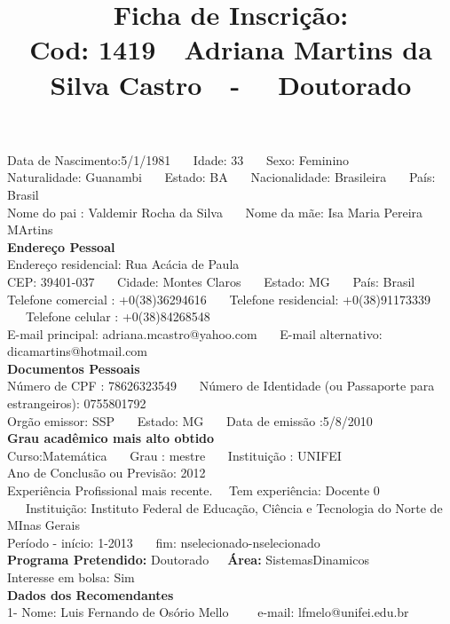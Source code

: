 \documentclass[11pt]{article}
\title{\vspace*{-4cm} Ficha de Inscrição: \\Cod: 1419\ \ Adriana Martins da Silva Castro\ \ - \ \ Doutorado 
 }
\date{}
\begin{document}
\maketitle
\vspace*{-1.5cm}
\noindent Data de Nascimento:5/1/1981
\ \ \ Idade: 33   \ \ \ Sexo: Feminino
\\
Naturalidade: Guanambi  
\ \ \  Estado: BA
\ \ \  Nacionalidade: Brasileira
\ \ \ País: Brasil
\\        
Nome do pai : Valdemir Rocha da Silva
\ \ \ Nome da mãe: Isa Maria Pereira MArtins          
\\[0.2cm]                     
\textbf{Endereço Pessoal} 
\\ 
\noindent Endereço residencial: Rua Acácia de Paula
\\
        CEP: 39401-037 
\ \ \ Cidade: Montes Claros 
\ \ \ Estado: MG 
\ \ \ País: Brasil
\\		
		Telefone comercial : +0(38)36294616
\ \ \ Telefone residencial: +0(38)91173339
\ \ \ Telefone celular : +0(38)84268548
\\
E-mail principal: adriana.mcastro@yahoo.com
\ \ \ E-mail alternativo: dicamartins@hotmail.com 
\\[0.2cm] 
\textbf{Documentos Pessoais}
\\
\noindent Número de CPF : 78626323549
\ \ \ Número de Identidade (ou Passaporte para estrangeiros): 0755801792
\\
Orgão emissor: SSP
\ \ \ Estado: MG
\ \ \ Data de emissão :5/8/2010
\\[0.3cm]
\textbf{Grau acadêmico mais alto obtido}
\\	
Curso:Matemática
\ \ \ Grau : mestre
\ \ \ Instituição : UNIFEI
\\			
Ano de Conclusão ou Previsão: 2012
\\ 
Experiência Profissional mais recente. \ \  
Tem experiência: Docente 0  
\ \ \ Instituição: Instituto Federal de Educação, Ciência e Tecnologia do Norte de MInas Gerais
\\  
Período - início: 1-2013
\ \ \ fim: nselecionado-nselecionado
\\[0.2cm] 
\textbf{Programa Pretendido:} Doutorado\ \ \ \textbf{Área:} SistemasDinamicos\\
Interesse em bolsa: Sim
\\[0.3cm]		
\textbf{Dados dos Recomendantes} 
\\
1- Nome: Luis Fernando de Osório Mello
\ \ \ \  e-mail: lfmelo@unifei.edu.br 
\\
\end{document}
